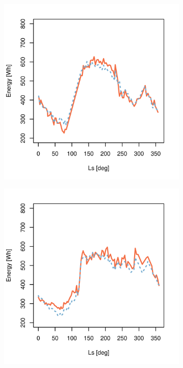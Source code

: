\begin{figure}[h]
\begin{subfigure}[t]{\subfigureWidth}
		\label{fig:plot:sub:mer-energy-production-predicted-vs-reported-my32-adjusted}
	\end{subfigure}\\[0.8ex]
    \begin{subfigure}[t]{\subfigureWidth}
        \centering
		\includegraphics[height=\graphicsHeight]{sections/appendix/B/plots/predicted-vs-measured-energy-my29-adjusted-without-outliers.png}
		\label{fig:plot:sub:mer-energy-production-predicted-vs-reported-my29-adjusted-without-outliers}
	\end{subfigure}\hfill
	\begin{subfigure}[t]{\subfigureWidth}
        \centering
		\includegraphics[height=\graphicsHeight]{sections/appendix/B/plots/predicted-vs-measured-energy-my30-adjusted-without-outliers.png}

\end{subfigure}
\end{figure}
